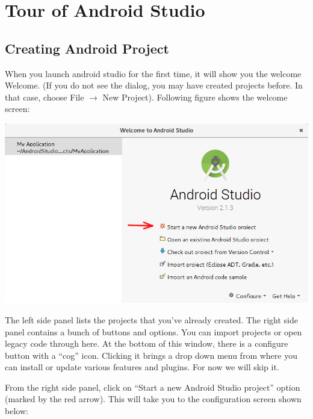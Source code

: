 \chapter{Tour of Android Studio}

\section{Creating Android Project}
When you launch android studio for the first time, it will show you the welcome Welcome. (If you do not see the dialog, you may have created projects before. In that case, choose File $\rightarrow$ New Project). Following figure shows the welcome screen:

\begin{center}
	\includegraphics[scale=0.3]{chapters/ch02/images/1_welcome_screen}
\end{center}

The left side panel lists the projects that you've already created. The right side panel contains a bunch of buttons and options. You can import projects or open legacy code through here. At the bottom of this window, there is a configure button with a ``cog'' icon. Clicking it brings a drop down menu from where you can install or update various features and plugins. For now we will skip it.

From the right side panel, click on ``Start a new Android Studio project'' option (marked by the red arrow). This will take you to the configuration screen shown below:

